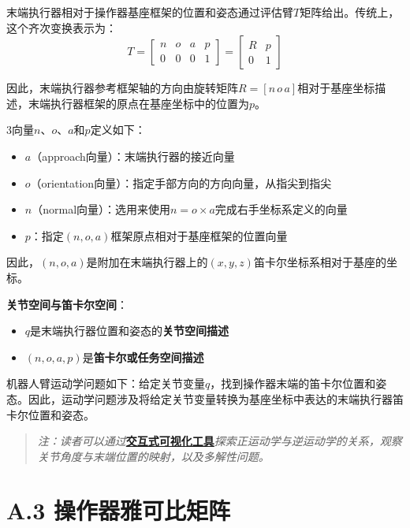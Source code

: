 \documentclass[UTF8,a4paper]{ctexart}
\begin{document}
末端执行器相对于操作器基座框架的位置和姿态通过评估臂$T$矩阵给出。传统上，这个齐次变换表示为：
\begin{equation}
T = \begin{bmatrix} n & o & a & p \\ 0 & 0 & 0 & 1 \end{bmatrix} = \begin{bmatrix} R & p \\ 0 & 1 \end{bmatrix}
\tag{A.2.11}
\end{equation}

因此，末端执行器参考框架轴的方向由旋转矩阵$R = [n \, o \, a]$相对于基座坐标描述，末端执行器框架的原点在基座坐标中的位置为$p$。

3向量$n$、$o$、$a$和$p$定义如下：
\begin{itemize}
    \item $a$（approach向量）：末端执行器的接近向量
    \item $o$（orientation向量）：指定手部方向的方向向量，从指尖到指尖
    \item $n$（normal向量）：选用来使用$n = o \times a$完成右手坐标系定义的向量
    \item $p$：指定$(n, o, a)$框架原点相对于基座框架的位置向量
\end{itemize}

因此，$(n, o, a)$是附加在末端执行器上的$(x, y, z)$笛卡尔坐标系相对于基座的坐标。

\textbf{关节空间与笛卡尔空间}：
\begin{itemize}
    \item $q$是末端执行器位置和姿态的\textbf{关节空间描述}
    \item $(n, o, a, p)$是\textbf{笛卡尔或任务空间描述}
\end{itemize}

机器人臂运动学问题如下：给定关节变量$q$，找到操作器末端的笛卡尔位置和姿态。因此，运动学问题涉及将给定关节变量转换为基座坐标中表达的末端执行器笛卡尔位置和姿态。

\begin{quote}
\textit{注：读者可以通过}\href{https://frankjie09.github.io/Robot-Manipulator-Control-CN/figures/Forward_Inverse_Kinematics.html}{\textbf{交互式可视化工具}}\textit{探索正运动学与逆运动学的关系，观察关节角度与末端位置的映射，以及多解性问题。}
\end{quote}

\section{A.3 操作器雅可比矩阵}
\end{document}
